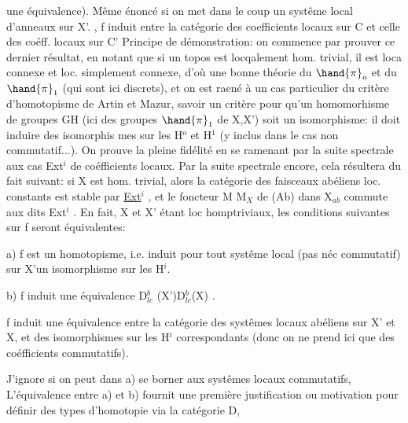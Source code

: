  une équivalence). Même énoncé si on met dans le
coup un  systême local d'anneaux sur X'. , f induit 
 entre la catégorie des coefficients locaux sur C et celle
des coéff. locaux sur C' 
 Principe de démonstration: on commence
par prouver ce dernier résultat, en notant que  si un topos est
locqalement hom. trivial, il est loca connexe et loc. simplement connexe,
d'où une bonne théorie du $\hand{\pi}_o$ et du $\hand{\pi}_1$ (qui sont ici discrets), et on est
raené  à un cas particulier du critère d'homotopisme de Artin et
Mazur, savoir un critère  pour qu'un homomorhisme de groupes G\hand{$\longrightarrow$}H (ici des
groupes $\hand{\pi}_1$ de X,X') soit un isomorphisme: il doit induire des isomorphis
mes sur les H$^o$ et H$^1$ (y inclus dans le cas non commutatif...). On prouve
la pleine fidélité en se ramenant par la suite spectrale aux cas  Ext$^i$
de coéfficients locaux. Par la suite spectrale encore, cela résultera du
fait suivant: si X est  hom. trivial, alors la catégorie des
faisceaux abéliens loc. constants est stable par \uline{Ext}$^i$ , et le foncteur
M \hand{$\longmapsto$}M$_X$ de (Ab) dans X$_{ab}$ commute aux dits Ext$^i$ .
En fait, X et X' étant loc homp\hand{|}triviaux, les conditions suivantes sur f
seront équivalentes:

a) f est un homotopisme, i.e. induit pour tout systême local (pas
néc commutatif) sur X'un isomorphisme sur les H$^i$.

b)  f induit une équivalence D$^b_{lc}$ (X')\hand{$\longrightarrow$}D$^b_{lc}$(X) .

 f induit une équivalence entre la catégorie des systêmes locaux
abéliens sur X' et X, et des isomorphismes sur les H$^i$ correspondants (donc
on ne prend ici que des coéfficients commutatifs).

 J'ignore si on peut dans a) se borner aux systêmes locaux commutatifs,
L'équivalence entre a) et b) fournit une première justification ou
 motivation pour définir des types d'homotopie via la catégorie D,
